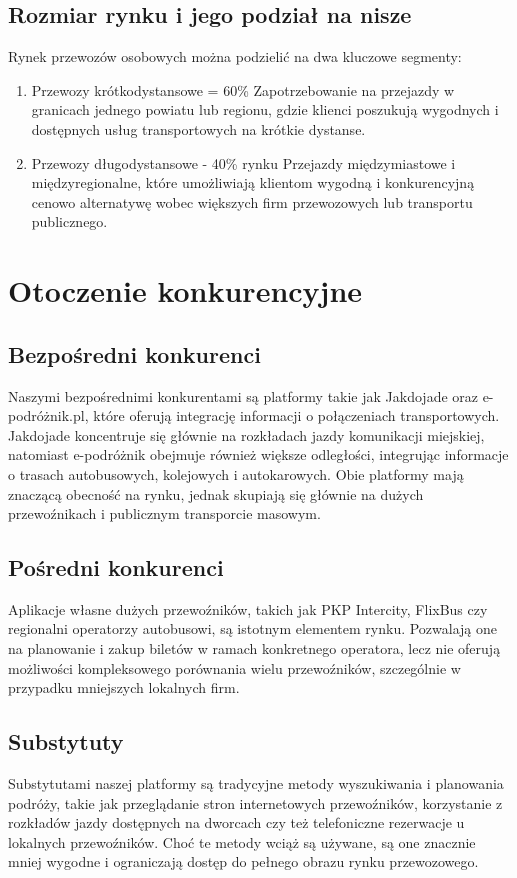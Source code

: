 \subsection{Rozmiar rynku i jego podział na nisze}
    Rynek przewozów osobowych można podzielić na dwa kluczowe segmenty:
    \begin{enumerate}
        \item Przewozy krótkodystansowe = 60\%
            Zapotrzebowanie na przejazdy w granicach jednego powiatu lub regionu, gdzie klienci poszukują wygodnych i dostępnych usług transportowych na krótkie dystanse.
        \item Przewozy długodystansowe - 40\% rynku
            Przejazdy międzymiastowe i międzyregionalne, które umożliwiają klientom wygodną i konkurencyjną cenowo alternatywę wobec większych firm przewozowych lub transportu publicznego.
    \end{enumerate}

    
\section{Otoczenie konkurencyjne}

    \subsection{Bezpośredni konkurenci}
    Naszymi bezpośrednimi konkurentami są platformy takie jak Jakdojade oraz e-podróżnik.pl, które oferują integrację informacji o połączeniach transportowych. Jakdojade koncentruje się głównie na rozkładach jazdy komunikacji miejskiej, natomiast e-podróżnik obejmuje również większe odległości, integrując informacje o trasach autobusowych, kolejowych i autokarowych. Obie platformy mają znaczącą obecność na rynku, jednak skupiają się głównie na dużych przewoźnikach i publicznym transporcie masowym.

    \subsection{Pośredni konkurenci}
    Aplikacje własne dużych przewoźników, takich jak PKP Intercity, FlixBus czy regionalni operatorzy autobusowi, są istotnym elementem rynku. Pozwalają one na planowanie i zakup biletów w ramach konkretnego operatora, lecz nie oferują możliwości kompleksowego porównania wielu przewoźników, szczególnie w przypadku mniejszych lokalnych firm.

    \subsection{Substytuty}
    Substytutami naszej platformy są tradycyjne metody wyszukiwania i planowania podróży, takie jak przeglądanie stron internetowych przewoźników, korzystanie z rozkładów jazdy dostępnych na dworcach czy też telefoniczne rezerwacje u lokalnych przewoźników. Choć te metody wciąż są używane, są one znacznie mniej wygodne i ograniczają dostęp do pełnego obrazu rynku przewozowego.

